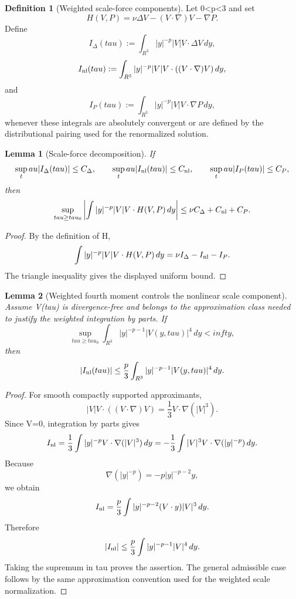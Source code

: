 \documentclass[11pt]{amsart}
\def\({}%
\def\){}%
\def\mathbb#1{#1}%
\def\tau{tau}%
\def\infty{infty}%
\theoremstyle{plain}
\newtheorem{lemma}[lemma]{Lemma}
\theoremstyle{definition}
\newtheorem{definition}[definition]{Definition}
\theoremstyle{remark}
\begin{document}
\begin{definition}[Weighted scale-force components]\label{paper7:def:scale-force-pieces}
Let \(0<p<3\) and set
\[
  H(V,P)=\nu\Delta V-(V\cdot\nabla)V-\nabla P.
\]
Define
\[
  I_\Delta(\tau):=\int_{\mathbb R^3}|y|^{-p}|V|V\cdot\Delta V\,dy,
\]
\[
  I_{\rm nl}(\tau):=\int_{\mathbb R^3}|y|^{-p}|V|V\cdot((V\cdot\nabla)V)\,dy,
\]
and
\[
  I_P(\tau):=\int_{\mathbb R^3}|y|^{-p}|V|V\cdot\nabla P\,dy,
\]
whenever these integrals are absolutely convergent or are defined by the
distributional pairing used for the renormalized solution.
\end{definition}

\begin{lemma}[Scale-force decomposition]\label{paper7:lem:scale-force-decomp}
If
\[
  \sup_\tau|I_\Delta(\tau)|\le C_\Delta,\qquad
  \sup_\tau|I_{\rm nl}(\tau)|\le C_{\rm nl},\qquad
  \sup_\tau|I_P(\tau)|\le C_P,
\]
then
\[
  \sup_{\tau\ge\tau_0}
  \left|
  \int |y|^{-p}|V|V\cdot H(V,P)\,dy
  \right|
  \le \nu C_\Delta+C_{\rm nl}+C_P.
\]
\end{lemma}

\begin{proof}
By the definition of \(H\),
\[
  \int |y|^{-p}|V|V\cdot H(V,P)\,dy
  =
  \nu I_\Delta-I_{\rm nl}-I_P.
\]
The triangle inequality gives the displayed uniform bound.
\end{proof}

\begin{lemma}[Weighted fourth moment controls the nonlinear scale component]
\label{paper7:lem:scale-nonlinear-from-l4}
Assume \(V(\tau)\) is divergence-free and belongs to the approximation class
needed to justify the weighted integration by parts.  If
\[
  \sup_{\tau\ge\tau_0}
  \int_{\mathbb R^3}|y|^{-p-1}|V(y,\tau)|^4\,dy<\infty,
\]
then
\[
  |I_{\rm nl}(\tau)|
  \le
  \frac{p}{3}\int_{\mathbb R^3}|y|^{-p-1}|V(y,\tau)|^4\,dy.
\]
\end{lemma}

\begin{proof}
For smooth compactly supported approximants,
\[
  |V|V\cdot((V\cdot\nabla)V)=\frac13 V\cdot\nabla(|V|^3).
\]
Since \(\nabla\cdot V=0\), integration by parts gives
\[
  I_{\rm nl}
  =\frac13\int |y|^{-p}V\cdot\nabla(|V|^3)\,dy
  =-\frac13\int |V|^3V\cdot\nabla(|y|^{-p})\,dy.
\]
Because
\[
  \nabla(|y|^{-p})=-p|y|^{-p-2}y,
\]
we obtain
\[
  I_{\rm nl}
  =\frac{p}{3}\int |y|^{-p-2}(V\cdot y)|V|^3\,dy.
\]
Therefore
\[
  |I_{\rm nl}|
  \le
  \frac{p}{3}\int |y|^{-p-1}|V|^4\,dy.
\]
Taking the supremum in \(\tau\) proves the assertion.  The general admissible
case follows by the same approximation convention used for the weighted scale
normalization.
\end{proof}
\end{document}
